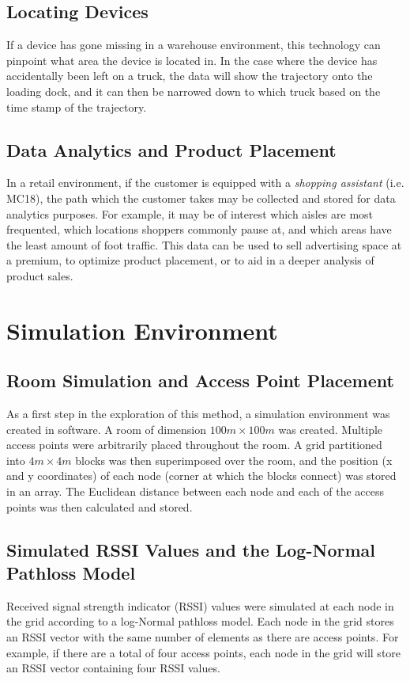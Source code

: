 \documentclass[12pt, a4paper]{article}
\begin{document}
		\subsection{Locating Devices}
		If a device has gone missing in a warehouse environment, this technology can pinpoint what area the device is located in. In the case where the device has accidentally been left on a truck, the data will show the trajectory onto the loading dock, and it can then be narrowed down to which truck based on the time stamp of the trajectory.
		\subsection{Data Analytics and Product Placement}
			In a retail environment, if the customer is equipped with a \textit{shopping assistant} (i.e. MC18), the path which the customer takes may be collected and stored for data analytics purposes. For example, it may be of interest which aisles are most frequented, which locations shoppers commonly pause at, and which areas have the least amount of foot traffic. This data can be used to sell advertising space at a premium, to optimize product placement, or to aid in a deeper analysis of product sales. 

	\section{Simulation Environment}
		\subsection{Room Simulation and Access Point Placement}
			As a first step in the exploration of this method, a simulation environment was created in software. A room of dimension $100m \times 100m$ was created. Multiple access points were arbitrarily placed throughout the room. A grid partitioned into $4m \times 4m$ blocks was then superimposed over the room, and the position (x and y coordinates) of each node (corner at which the blocks connect) was stored in an array. The Euclidean distance between each node and each of the access points was then calculated and stored.
		\subsection{Simulated RSSI Values and the Log-Normal Pathloss Model}
			Received signal strength indicator (RSSI) values were simulated at each node in the grid according to a log-Normal pathloss model. Each node in the grid stores an RSSI vector with the same number of elements as there are access points. For example, if there are a total of four access points, each node in the grid will store an RSSI vector containing four RSSI values. \\
\end{document}
